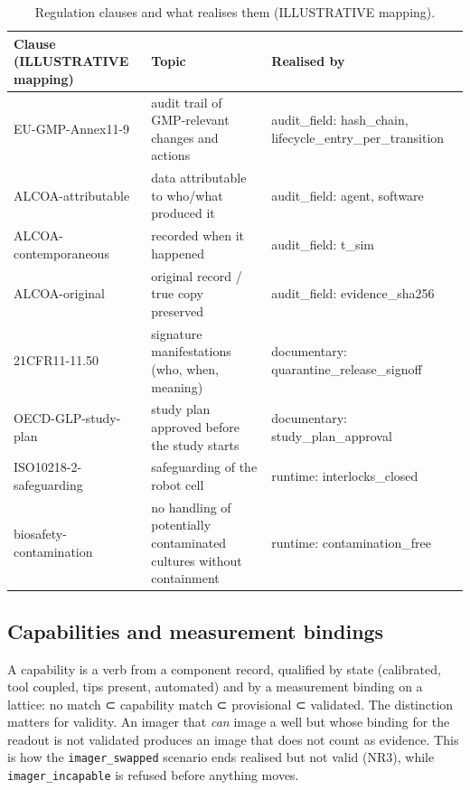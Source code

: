 \documentclass[10pt,a4paper]{article}
\begin{document}
\begin{table}[tbp]\centering\small
\caption{Regulation clauses and what realises them (ILLUSTRATIVE mapping).}\label{tab:norms}
\begin{tabularx}{\linewidth}{p{3.4cm}Xp{4.6cm}}\toprule
\textbf{Clause (ILLUSTRATIVE mapping)} & \textbf{Topic} & \textbf{Realised by} \\\midrule
EU-GMP-Annex11-9 & audit trail of GMP-relevant changes and actions & audit\_\allowbreak{}field: hash\_\allowbreak{}chain, lifecycle\_\allowbreak{}entry\_\allowbreak{}per\_\allowbreak{}transition \\
ALCOA-attributable & data attributable to who/what produced it & audit\_\allowbreak{}field: agent, software \\
ALCOA-contemporaneous & recorded when it happened & audit\_\allowbreak{}field: t\_\allowbreak{}sim \\
ALCOA-original & original record / true copy preserved & audit\_\allowbreak{}field: evidence\_\allowbreak{}sha256 \\
21CFR11-11.50 & signature manifestations (who, when, meaning) & documentary: quarantine\_\allowbreak{}release\_\allowbreak{}signoff \\
OECD-GLP-study-plan & study plan approved before the study starts & documentary: study\_\allowbreak{}plan\_\allowbreak{}approval \\
ISO10218-2-safeguarding & safeguarding of the robot cell & runtime: interlocks\_\allowbreak{}closed \\
biosafety-contamination & no handling of potentially contaminated cultures without containment & runtime: contamination\_\allowbreak{}free \\\bottomrule
\end{tabularx}
\end{table}

\subsection{Capabilities and measurement bindings}\label{sec:capability}

A capability is a verb from a component record, qualified by state (calibrated, tool coupled, tips present, automated) and by a measurement binding on a lattice: no match ⊂ capability match ⊂ provisional ⊂ validated. The distinction matters for validity. An imager that \emph{can} image a well but whose binding for the readout is not validated produces an image that does not count as evidence. This is how the \texttt{imager\_\allowbreak{}swapped} scenario ends realised but not valid (NR3), while \texttt{imager\_\allowbreak{}incapable} is refused before anything moves.
\end{document}
